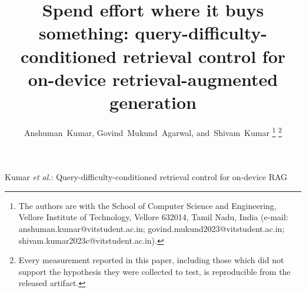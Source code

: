 \documentclass[journal]{IEEEtran}
\begin{document}
\title{Spend effort where it buys something:
query-difficulty-conditioned retrieval control for
on-device retrieval-augmented generation}

\author{Anshuman~Kumar,
        Govind~Mukund~Agarwal,
        and~Shivam~Kumar%
\thanks{The authors are with the School of Computer Science and
Engineering, Vellore Institute of Technology, Vellore 632014, Tamil Nadu,
India (e-mail: anshuman.kumar@vitstudent.ac.in;
govind.mukund2023@vitstudent.ac.in; shivam.kumar2023c@vitstudent.ac.in).}%
\thanks{Every measurement reported in this paper, including those which
did not support the hypothesis they were collected to test, is
reproducible from the released artifact.}}

%
{Kumar \MakeLowercase{\textit{et al.}}: Query-difficulty-conditioned retrieval control for on-device RAG}

\maketitle
\end{document}
